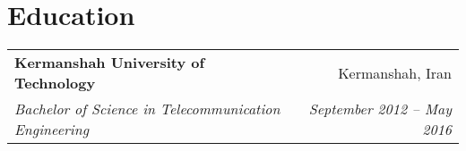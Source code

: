 \documentclass[letterpaper,11pt]{article}
\makeatletter
\newcommand{\resumeItem}[2]{
  \item\small{
    \textbf{#1}{: #2 \vspace{-2pt}}
  }
}
\newcommand{\resumeItemSimple}[1]{
  \item\small{
    {#1}
  }
}
\newcommand{\resumeSubheading}[4]{
  \vspace{-1pt}
    \begin{tabular*}{1\textwidth}[t]{l@{\extracolsep{\fill}}r}
      \textbf{#1} & #2 \\
      \textit{\small#3} & \textit{\small #4} \\
    \end{tabular*}
}
\newcommand{\resumeSubheadingSimple}[5]{
  \vspace{-1pt}
    \begin{tabular*}{1\textwidth}[t]{l@{\extracolsep{\fill}}r}
      \textbf{#1}, \textbf{\href{#3}{#2}} \space \small#4 & \textit{\small #5} \\
    \end{tabular*}
}
\newcommand{\resumeSubSubheading}[2]{
    \begin{tabular*}{1\textwidth}{l@{\extracolsep{\fill}}r}
      \textit{\small#1} & \textit{\small #2} \\
    \end{tabular*}\vspace{-5pt}
}
\newcommand{\resumeSubItem}[2]{\resumeItem{#1}{#2}\vspace{-4pt}}
\newcommand{\resumeSubHeadingListStart}{\begin{itemize}[leftmargin=*]}
\newcommand{\resumeSubHeadingListEnd}{\end{itemize}}
\newcommand{\resumeItemListStart}{\begin{itemize}[leftmargin=0.5cm, itemsep=1pt, parsep=0pt]} %
\newcommand{\resumeItemListEnd}{\end{itemize}\vspace{-3pt}}
\makeatother
\begin{document}


\section{Education}
    \resumeSubheading
      {Kermanshah University of Technology}{Kermanshah, Iran}
      {Bachelor of Science in Telecommunication Engineering}{September 2012 -- May 2016}\vspace{3px}

\end{document}
